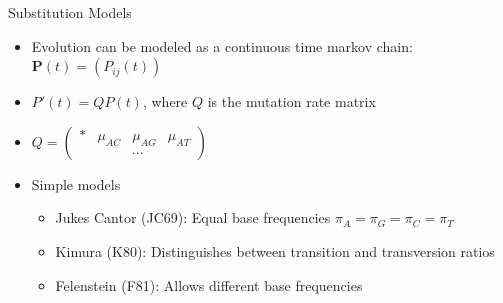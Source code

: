\documentclass[10pt]{beamer}
\begin{document}
\begin{frame}[fragile]{Substitution Models}
\begin{itemize}
\item Evolution can be modeled as a continuous time markov chain: $\mathbf{P}(t) = (P_{ij}(t))$
\item $P'(t) = QP(t)$, where $Q$ is the mutation rate matrix 
\item $Q= \begin{pmatrix} * & \mu_{AC} & \mu_{AG} & \mu_{AT}\\
& & \cdots \end{pmatrix}$
\item Simple models 
\begin{itemize}
\item Jukes Cantor (JC69): Equal base frequencies $\pi_A = \pi_G = \pi_C = \pi_T$
\item Kimura (K80): Distinguishes between transition and transversion ratios
\item Felenstein (F81): Allows different base frequencies
\end{itemize} 
\end{itemize} 
\end{frame}

\end{document}
